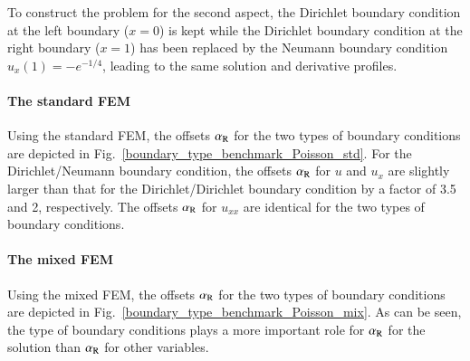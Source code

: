 \documentclass[review,3p]{elsarticle}
\begin{document}
To construct the problem for the second aspect, the Dirichlet boundary condition at the left boundary ($x=0$) is kept while the Dirichlet boundary condition at the right boundary ($x=1$) has been replaced by the Neumann boundary condition $u_x (1) = -e^{-1/4}$, leading to the same solution and derivative profiles. 


\paragraph{The standard FEM}
Using the standard FEM, the offsets $\alpha_{\rm R}$ for the two types of boundary conditions are depicted in Fig.~\ref{boundary_type_benchmark_Poisson_std}. 
For the Dirichlet/Neumann boundary condition, the offsets $\alpha_{\rm R}$ for $u$ and $u_x$ are slightly larger than that for the Dirichlet/Dirichlet boundary condition by a factor of 3.5 and 2, respectively. The offsets $\alpha_{\rm R}$ for $u_{xx}$ are identical for the two types of boundary conditions.

\paragraph{The mixed FEM}
Using the mixed FEM, the offsets $\alpha_{\rm R}$ for the two types of boundary conditions are depicted in Fig.~\ref{boundary_type_benchmark_Poisson_mix}.
As can be seen, the type of boundary conditions plays a more important role for $\alpha_{\rm R}$ for the solution than $\alpha_{\rm R}$ for other variables.
\end{document}
